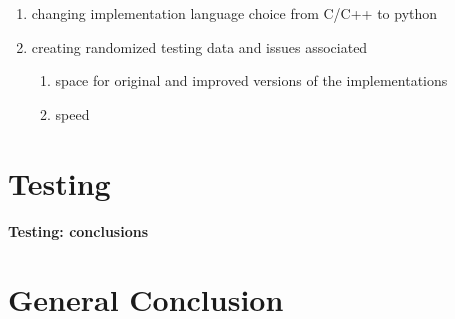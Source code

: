 \documentclass{article}
\begin{document}
\pagebreak
\begin{enumerate}
\item changing implementation language choice from C/C++ to python
\item creating randomized testing data and issues associated
\begin{enumerate}
\item space for original and improved versions of the implementations
\item speed
\end{enumerate}
\end{enumerate}


\section{Testing}\label{sec:testing}

\textbf{Testing: conclusions}

\section{General Conclusion}
\end{document}
